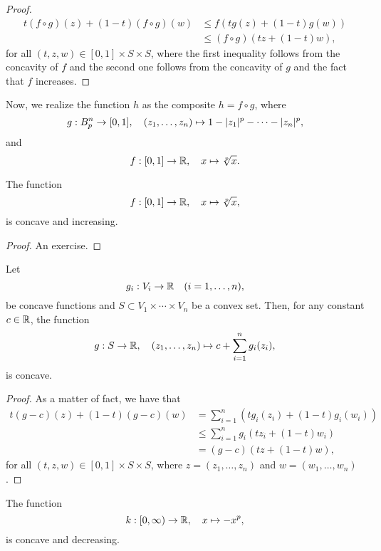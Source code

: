 \begin{proof}
  \begin{align*}
    t(f\circ{g})(z)+(1-t)(f\circ{g})(w)
    &\leqslant{f(tg(z)+(1-t)g(w))}\\
    &\leqslant{(f\circ{g})(tz+(1-t)w)},
  \end{align*}
  for all \((t,z,w)\in{[0,1]\times{S}\times{S}}\), where the first inequality
  follows from the concavity of \(f\) and the second one follows from the
  concavity of \(g\) and the fact that \(f\) increases.
\end{proof}

Now, we realize the function \(h\) as the composite \(h=f\circ{g}\), where
\[
  g:B^{n}_{p}\to[0,1],
  \quad{(z_{1},\ldots,z_{n})\mapsto{1-\lvert z_{1}\rvert^{p}-\cdots-\lvert z_{n}\rvert^{p}}},
\]
and
\[
  f:[0,1]\to\mathbb{R},\quad{x\mapsto{\sqrt[p]{x}}}.
\]

\begin{lemma}
  The function
  \[
    f:[0,1]\to\mathbb{R},\quad{x\mapsto\sqrt[p]{x}},
  \]
  is concave and increasing.
\end{lemma}

\begin{proof}
  An exercise.
\end{proof}

\begin{lemma}
  Let
  \[
    g_{i}:V_{i}\to\mathbb{R}\quad{(i=1,\ldots,n)},
  \]
  be concave functions and \(S\subset{V_{1}\times\cdots\times{V_{n}}}\) be a
  convex set. Then, for any constant \(c\in\mathbb{R}\), the function
  \[
    g:S\to\mathbb{R},\quad{(z_{1},\ldots,z_{n})\mapsto{c+\sum_{i=1}^{n}g_{i}(z_{i})}},
  \]
  is concave.
\end{lemma}

\begin{proof}
  As a matter of fact, we have that
  \begin{align*}
    t(g-c)(z)+(1-t)(g-c)(w)
    &=
    \sum_{i=1}^{n}\left(tg_{i}(z_{i})+(1-t)g_{i}(w_{i})\right)
    \\
    &\leqslant
    \sum_{i=1}^{n}g_{i}\left(tz_{i}+(1-t)w_{i}\right)
    \\
    &=
    (g-c)\left(tz+(1-t)w\right),
  \end{align*}
  for all \((t,z,w)\in{[0,1]\times{S}\times{S}}\), where
  \(z=(z_{1},\ldots,z_{n})\) and \(w=(w_{1},\ldots,w_{n})\).
\end{proof}

\begin{lemma}
  The function
  \[
    k:[0,\infty)\to\mathbb{R},\quad{x\mapsto{-x^{p}}},
  \]
  is concave and decreasing.
\end{lemma}

